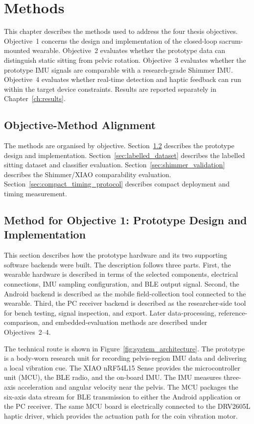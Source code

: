 \chapter{Methods}\label{ch:methods}

This chapter describes the methods used to address the four thesis objectives. Objective~1 concerns the design and implementation of the closed-loop sacrum-mounted wearable. Objective~2 evaluates whether the prototype data can distinguish static sitting from pelvic rotation. Objective~3 evaluates whether the prototype IMU signals are comparable with a research-grade Shimmer IMU. Objective~4 evaluates whether real-time detection and haptic feedback can run within the target device constraints. Results are reported separately in Chapter~\ref{ch:results}.

\section{Objective-Method Alignment}

The methods are organised by objective. Section~\ref{sec:method_obj1} describes the prototype design and implementation. Section~\ref{sec:labelled_dataset} describes the labelled sitting dataset and classifier evaluation. Section~\ref{sec:shimmer_validation} describes the Shimmer/XIAO comparability evaluation. Section~\ref{sec:compact_timing_protocol} describes compact deployment and timing measurement.

\section{Method for Objective 1: Prototype Design and Implementation}\label{sec:method_obj1}

This section describes how the prototype hardware and its two supporting software backends were built. The description follows three parts. First, the wearable hardware is described in terms of the selected components, electrical connections, IMU sampling configuration, and BLE output signal. Second, the Android backend is described as the mobile field-collection tool connected to the wearable. Third, the PC receiver backend is described as the researcher-side tool for bench testing, signal inspection, and export. Later data-processing, reference-comparison, and embedded-evaluation methods are described under Objectives~2--4.

The technical route is shown in Figure~\ref{fig:system_architecture}. The prototype is a body-worn research unit for recording pelvis-region IMU data and delivering a local vibration cue. The XIAO nRF54L15 Sense provides the microcontroller unit (MCU), the BLE radio, and the on-board IMU. The IMU measures three-axis acceleration and angular velocity near the pelvis. The MCU packages the six-axis data stream for BLE transmission to either the Android application or the PC receiver. The same MCU board is electrically connected to the DRV2605L haptic driver, which provides the actuation path for the coin vibration motor.

